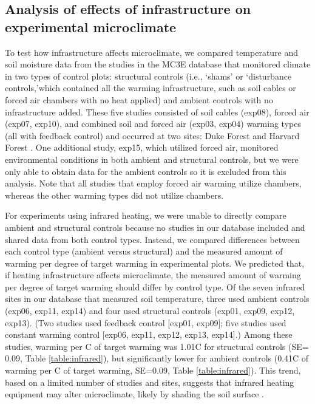 \documentclass{article}
\begin{document}
\subsection* {Analysis of effects of infrastructure on experimental microclimate}
To test how infrastructure affects microclimate, we compared temperature and soil moisture data from the studies in the MC3E database that monitored climate in two types of control plots: structural controls (i.e., `shams' or `disturbance controls,'which contained all the warming infrastructure, such as soil cables or forced air chambers with no heat applied) and ambient controls with no infrastructure added. These five studies consisted of soil cables (exp08), forced air (exp07, exp10), and combined soil and forced air (exp03, exp04) warming types (all with feedback control) and occurred at two sites: Duke Forest and Harvard Forest \citep{farnsworth1995,clark2014a,marchin2015,pelini2011}. One additional study, exp15, which utilized forced air, monitored environmental conditions in both ambient and structural controls, but we were only able to obtain data for the ambient controls so it is excluded from this analysis. Note that all studies that employ forced air warming utilize chambers, whereas the other warming types did not utilize chambers.
\par For experiments using infrared heating, we were unable to directly compare ambient and structural controls because no studies in our database included and shared data from both control types. Instead, we compared differences between each control type (ambient versus structural) and the measured amount of warming per degree of target warming in experimental plots. We predicted that, if heating infrastructure affects microclimate, the measured amount of warming per degree of target warming should differ by control type. Of the seven infrared sites in our database that measured soil temperature, three used ambient controls (exp06, exp11, exp14) and four used structural controls (exp01, exp09, exp12, exp13). (Two studies used feedback control [exp01, exp09]; five studies used constant warming control [exp06, exp11, exp12, exp13, exp14].) Among these studies, warming per \degree C of target warming was 1.01\degree C for structural controls (SE= 0.09, Table  \ref{table:infrared}), but significantly lower for ambient controls (0.41\degree C of warming per \degree C of target warming, SE=0.09, Table \ref{table:infrared}). This trend, based on a limited number of studies and sites, suggests that infrared heating equipment may alter microclimate, likely by shading the soil surface \citep{mcdaniel2014}.  
\end{document}
